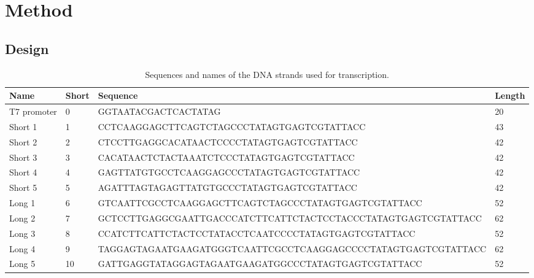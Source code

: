 \section{Method}

\subsection{Design}

\begin{table}
\begin{adjustbox}{width=\columnwidth}
\begin{tabular}{llll}
\hline
\textbf{Name}      & \textbf{Short} & \textbf{Sequence}                                           & \textbf{Length} \\
\hline
T7 promoter        & 0          & GGTAATACGACTCACTATAG                                           & 20     \\
Short 1            & 1          & CCTCAAGGAGCTTCAGTCTAGCCCTATAGTGAGTCGTATTACC                    & 43     \\
Short 2            & 2          & CTCCTTGAGGCACATAACTCCCCTATAGTGAGTCGTATTACC                     & 42     \\
Short 3            & 3          & CACATAACTCTACTAAATCTCCCTATAGTGAGTCGTATTACC                     & 42     \\
Short 4            & 4          & GAGTTATGTGCCTCAAGGAGCCCTATAGTGAGTCGTATTACC                    & 42     \\
Short 5            & 5          & AGATTTAGTAGAGTTATGTGCCCTATAGTGAGTCGTATTACC                     & 42     \\
Long 1             & 6          & GTCAATTCGCCTCAAGGAGCTTCAGTCTAGCCCTATAGTGAGTCGTATTACC           & 52     \\
Long 2             & 7          & GCTCCTTGAGGCGAATTGACCCATCTTCATTCTACTCCTACCCTATAGTGAGTCGTATTACC & 62     \\
Long 3             & 8          & CCATCTTCATTCTACTCCTATACCTCAATCCCCTATAGTGAGTCGTATTACC           & 52     \\
Long 4             & 9          & TAGGAGTAGAATGAAGATGGGTCAATTCGCCTCAAGGAGCCCCTATAGTGAGTCGTATTACC & 62     \\
Long 5             & 10         & GATTGAGGTATAGGAGTAGAATGAAGATGGCCCTATAGTGAGTCGTATTACC           & 52     \\
\hline
\end{tabular}
\end{adjustbox}
\caption{Sequences and names of the DNA strands used for transcription.}
\label{dna_strands}
\end{table}

